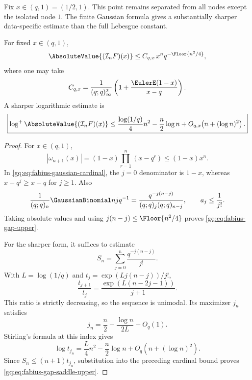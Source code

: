 Fix $x\in(q,1)=(1/2,1)$.  This point remains separated from all nodes except
the isolated node $1$.  The finite Gaussian formula gives a substantially
sharper data-specific estimate than the full Lebesgue constant.

\begin{theorem}
\label{gq:thm:fabius-gap-upper}
For fixed $x\in(q,1)$,
\begin{equation}
 \AbsoluteValue{(\Interp_nF)(x)}
 \le C_{q,x}\,x^n q^{-\Floor{n^2/4}},
 \label{gq:eq:fabius-gap-upper}
\end{equation}
where one may take
\begin{equation}
 C_{q,x}=\frac1{(q;q)_\infty^2}
 \left(1+\frac{\EulerE(1-x)}{x-q}\right).
 \label{gq:eq:fabius-gap-constant}
\end{equation}
A sharper logarithmic estimate is
\begin{equation}
 \boxed{
 \log^+\AbsoluteValue{(\Interp_nF)(x)}
 \le \frac{\log(1/q)}4n^2-\frac n2\log n
      +O_{q,x}\!\left(n+(\log n)^2\right).}
 \label{gq:eq:fabius-gap-saddle-upper}
\end{equation}
\end{theorem}

\begin{proof}
For $x\in(q,1)$,
\[
 |\omega_{n+1}(x)|
 =(1-x)\prod_{r=1}^{n}(x-q^r)
 \le(1-x)x^n.
\]
In \eqref{gq:eq:fabius-gaussian-cardinal}, the $j=0$ denominator is $1-x$,
whereas $x-q^j\ge x-q$ for $j\ge1$.  Also
\[
 \frac1{(q;q)_n}\GaussianBinomial nj{q^{-1}}
 =\frac{q^{-j(n-j)}}{(q;q)_j(q;q)_{n-j}},
 \qquad a_j\le\frac1{j!}.
\]
Taking absolute values and using
$j(n-j)\le\Floor{n^2/4}$ proves
\eqref{gq:eq:fabius-gap-upper}.

For the sharper form, it suffices to estimate
\[
 S_n=\sum_{j=0}^{n}\frac{q^{-j(n-j)}}{j!}.
\]
With $L=\log(1/q)$ and
$t_j=\exp(Lj(n-j))/j!$,
\begin{equation}
 \frac{t_{j+1}}{t_j}
 =\frac{\exp(L(n-2j-1))}{j+1}.
 \label{gq:eq:fabius-saddle-ratio}
\end{equation}
This ratio is strictly decreasing, so the sequence is unimodal.  Its
maximizer $j_n$ satisfies
\begin{equation}
 j_n=\frac n2-\frac{\log n}{2L}+O_q(1).
 \label{gq:eq:fabius-saddle-location}
\end{equation}
Stirling's formula at this index gives
\[
 \log t_{j_n}
 =\frac L4n^2-\frac n2\log n
   +O_q\!\left(n+(\log n)^2\right).
\]
Since $S_n\le(n+1)t_{j_n}$, substitution into the preceding cardinal bound
proves \eqref{gq:eq:fabius-gap-saddle-upper}.
\end{proof}

